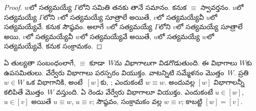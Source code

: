 \documentclass[../../../include/open-logic-section]{subfiles}
\begin{document}
\begin{proof}
  $w$లో సత్యమయ్యే $\Gamma$లోని
   సమితి తనకు తానే సమానం.
  కనుక $\equiv$ స్వావర్తనం. $u$లో సత్యమయ్యే $\Gamma$లోని
   $v$లో సత్యమయ్యే సూత్రాలే అయితే,
  $v$లో సత్యమయ్యేవీ $u$లో సత్యమయ్యేవే. కనుక సౌష్ఠవం.
  అలాగే $u$లో సత్యమయ్యే $\Gamma$లోని
   $v$లో సత్యమయ్యే సూత్రాలే అయి,
  $v$లో సత్యమయ్యేవీ $w$లో సత్యమయ్యేవే అయితే,
  $u$లో సత్యమయ్యే  $w$లో సత్యమయ్యేవే.
  కనుక సంక్రామకం.
\end{proof}

ఏ తుల్యతా సంబంధంలాగే, $\equiv$ కూడా~$W$ను
\emph{విభాగాలు}గా విడగొడుతుంది. ఈ విభాగాలు $W$కు ఉపసమితులు.
వేర్వేరు విభాగాలు పరస్పరం వియుక్తం. వాటన్నిటి సమ్మేళనం
మొత్తం~$W$. ప్రతి $w \in W$ ఒక
విభాగానికి, అంటే~$[w]$కు,
; ఎందుకంటే $w \equiv w$.
అందువల్ల $[w]$ విభాగాలన్నీ కలిపితే మొత్తం~$W$ వస్తుంది.
ఏ రెండు వేర్వేరు విభాగాలూ వియుక్తం. ఎందుకంటే $u \in [w]$, $u \in [v]$
అయితే $u \equiv w$, $u \equiv v$; సౌష్ఠవం,
సంక్రామకం వల్ల $w \equiv v$; కాబట్టి $[w] = [v]$.
\end{document}
